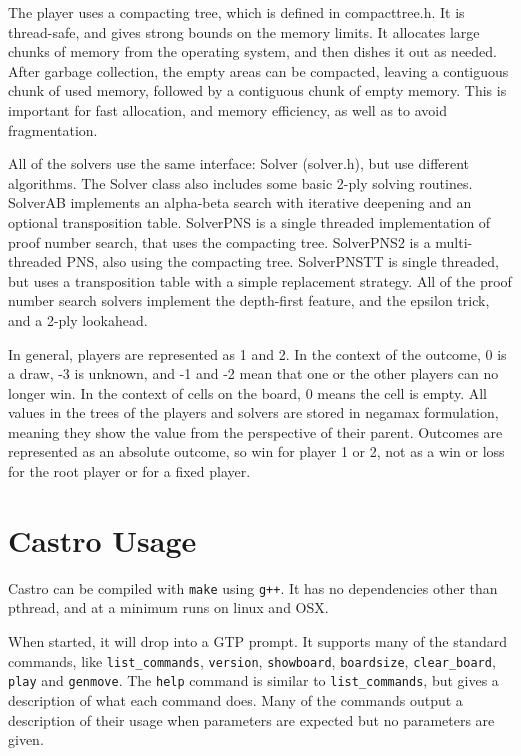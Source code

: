 \documentclass[12pt]{article}          %
\begin{document}
The player uses a compacting tree, which is defined in compacttree.h. It is thread-safe, and gives strong bounds on the memory limits. It allocates large chunks of memory from the operating system, and then dishes it out as needed. After garbage collection, the empty areas can be compacted, leaving a contiguous chunk of used memory, followed by a contiguous chunk of empty memory. This is important for fast allocation, and memory efficiency, as well as to avoid fragmentation.

All of the solvers use the same interface: Solver (solver.h), but use different algorithms. The Solver class also includes some basic 2-ply solving routines. SolverAB implements an alpha-beta search with iterative deepening and an optional transposition table. SolverPNS is a single threaded implementation of proof number search, that uses the compacting tree. SolverPNS2 is a multi-threaded PNS, also using the compacting tree. SolverPNSTT is single threaded, but uses a transposition table with a simple replacement strategy. All of the proof number search solvers implement the depth-first feature, and the epsilon trick, and a 2-ply lookahead.

In general, players are represented as 1 and 2. In the context of the outcome, 0 is a draw, -3 is unknown, and -1 and -2 mean that one or the other players can no longer win. In the context of cells on the board, 0 means the cell is empty. All values in the trees of the players and solvers are stored in negamax formulation, meaning they show the value from the perspective of their parent. Outcomes are represented as an absolute outcome, so win for player 1 or 2, not as a win or loss for the root player or for a fixed player.


\section{Castro Usage}

Castro can be compiled with \texttt{make} using \texttt{g++}. It has no dependencies other than pthread, and at a minimum runs on linux and OSX.

When started, it will drop into a GTP prompt. It supports many of the standard commands, like \texttt{list\_commands}, \texttt{version}, \texttt{showboard}, \texttt{boardsize}, \texttt{clear\_board}, \texttt{play} and \texttt{genmove}. The \texttt{help} command is similar to \texttt{list\_commands}, but gives a description of what each command does. Many of the commands output a description of their usage when parameters are expected but no parameters are given.
\end{document}
